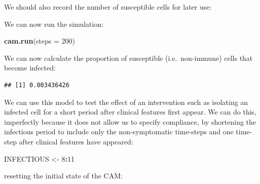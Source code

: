 \documentclass[12pt,a4paper]{book}
\newenvironment{Shaded}{\begin{snugshade}}{\end{snugshade}}
\newcommand{\KeywordTok}[1]{\textcolor[rgb]{0.13,0.29,0.53}{\textbf{#1}}}
\newcommand{\DataTypeTok}[1]{\textcolor[rgb]{0.13,0.29,0.53}{#1}}
\newcommand{\DecValTok}[1]{\textcolor[rgb]{0.00,0.00,0.81}{#1}}
\newcommand{\StringTok}[1]{\textcolor[rgb]{0.31,0.60,0.02}{#1}}
\newcommand{\OperatorTok}[1]{\textcolor[rgb]{0.81,0.36,0.00}{\textbf{#1}}}
\newcommand{\NormalTok}[1]{#1}
\theoremstyle{definition}
\theoremstyle{definition}
\theoremstyle{definition}
\theoremstyle{remark}
\begin{document}
We should also record the number of susceptible cells for later use:

\begin{Shaded}
\end{Shaded}

We can now run the simulation:

\begin{Shaded}
\begin{Highlighting}[]
\KeywordTok{cam.run}\NormalTok{(}\DataTypeTok{steps =} \DecValTok{200}\NormalTok{)}
\end{Highlighting}
\end{Shaded}

We can now calculate the proportion of susceptible (i.e.~non-immune)
cells that become infected:

\begin{Shaded}
\end{Shaded}

\begin{verbatim}
## [1] 0.003436426
\end{verbatim}

We can use this model to test the effect of an intervention such as
isolating an infected cell for a short period after clinical features
first appear. We can do this, imperfectly because it does not allow us
to specify compliance, by shortening the infectious period to include
only the non-symptomatic time-steps and one time- step after clinical
features have appeared:

\begin{Shaded}
\begin{Highlighting}[]
\NormalTok{INFECTIOUS <-}\StringTok{ }\DecValTok{8}\OperatorTok{:}\DecValTok{11}
\end{Highlighting}
\end{Shaded}

resetting the initial state of the CAM:
\end{document}
